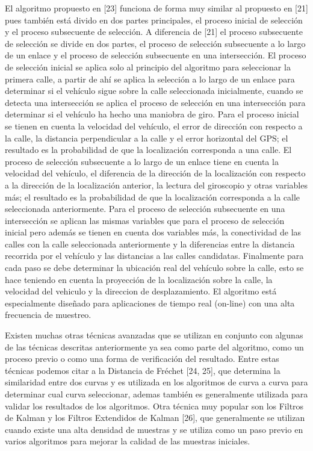 El algoritmo propuesto en [23] funciona de forma muy similar al propuesto en [21] pues también está divido en dos partes principales, el proceso inicial de selección y el proceso subsecuente de selección. A diferencia de [21] el proceso subsecuente de selección se divide en dos partes, el proceso de selección subsecuente a lo largo de un enlace y el proceso de selección subsecuente en una intersección. El proceso de selección inicial se aplica solo al principio del algoritmo para seleccionar la primera calle, a partir de ahí se aplica la  selección a lo largo de un enlace para determinar si el vehículo sigue sobre la calle seleccionada inicialmente, cuando se detecta una intersección se aplica el proceso de selección en una intersección para determinar si el vehículo ha hecho una maniobra de giro. Para el proceso inicial se tienen en cuenta la velocidad del vehículo, el error de dirección con respecto a la calle, la distancia perpendicular a la calle y el error horizontal del GPS; el resultado es la probabilidad de que la localización corresponda a una calle. El proceso de selección subsecuente a lo largo de un enlace tiene en cuenta la velocidad del vehículo, el diferencia de la dirección de la localización con respecto a la dirección de la localización anterior, la lectura del giroscopio y otras variables más; el resultado es la probabilidad de que la localización corresponda a la calle seleccionada anteriormente. Para el proceso de selección subsecuente en una intersección se aplican las mismas variables que para el proceso de selección inicial pero además se tienen en cuenta dos variables más, la conectividad de las calles con la calle seleccionada anteriormente y la diferencias entre la distancia recorrida por el vehículo y las distancias a las calles candidatas. Finalmente para cada paso se debe determinar la ubicación real del vehículo sobre la calle, esto se hace teniendo en cuenta la proyección de la localización sobre la calle, la velocidad del vehiculo y la direccion de desplazamiento. El algoritmo está especialmente diseñado para aplicaciones de tiempo real (on-line) con una alta frecuencia de muestreo.

Existen muchas otras técnicas avanzadas que se utilizan en conjunto con algunas de las técnicas descritas anteriormente ya sea como parte del algoritmo, como un proceso previo o como una forma de verificación del resultado. Entre estas técnicas podemos citar a la Distancia de Fréchet [24, 25], que determina la similaridad entre dos curvas y es utilizada en los algoritmos de curva a curva para determinar cual curva seleccionar, ademas también es generalmente utilizada para validar los resultados de los algoritmos. Otra técnica muy popular son los Filtros de Kalman y los Filtros Extendidos de Kalman [26], que generalmente se utilizan cuando existe una alta densidad de muestras y se utiliza como un paso previo en varios algoritmos para mejorar la calidad de las muestras iniciales.

